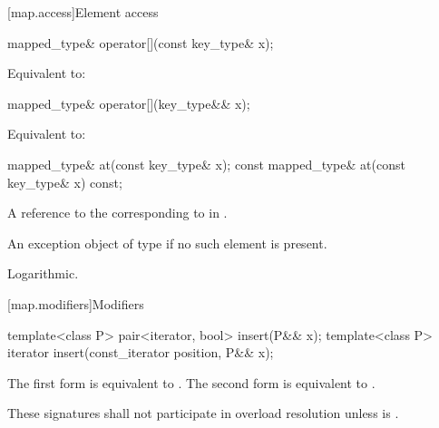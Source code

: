 [map.access]{Element access}

%
\begin{itemdecl}
mapped_type& operator[](const key_type& x);
\end{itemdecl}

\begin{itemdescr}
\pnum
\effects
Equivalent to: 
\end{itemdescr}

%
\begin{itemdecl}
mapped_type& operator[](key_type&& x);
\end{itemdecl}

\begin{itemdescr}
\pnum
\effects
Equivalent to: 
\end{itemdescr}

%
\begin{itemdecl}
mapped_type&       at(const key_type& x);
const mapped_type& at(const key_type& x) const;
\end{itemdecl}

\begin{itemdescr}
\pnum
\returns
A reference to the  corresponding to  in .

\pnum
\throws
An exception object of type  if
no such element is present.

\pnum
\complexity Logarithmic.
\end{itemdescr}

[map.modifiers]{Modifiers}

%
\begin{itemdecl}
template<class P>
  pair<iterator, bool> insert(P&& x);
template<class P>
  iterator insert(const_iterator position, P&& x);
\end{itemdecl}

\begin{itemdescr}
\pnum
\effects
The first form is equivalent to
. The second form is
equivalent to .

\pnum
\remarks
These signatures shall not participate in overload resolution
unless  is
.
\end{itemdescr}

